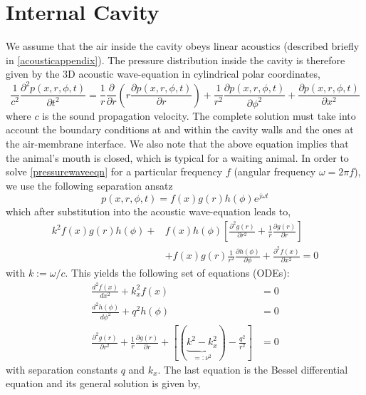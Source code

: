 \section{Internal Cavity}
We assume that the air inside the cavity obeys linear acoustics (described briefly in \ref{acousticappendix}). The pressure distribution inside the cavity
is therefore given by the $3$D acoustic wave-equation in cylindrical polar coordinates,	
\begin{equation}\label{pressurewaveeqn}
 \frac{1}{c^2}\frac{\partial^2 p(x,r,\phi,t)}{\partial t^2}=\frac{1}{r}\frac{\partial}{\partial r}\left(r\frac{\partial p(x,r,\phi,t)}{\partial r}\right)
 +\frac{1}{r^2}\frac{\partial p(x,r,\phi,t)}{\partial \phi^2}+\frac{\partial p(x,r,\phi,t)}{\partial x^2}
\end{equation}
where $c$ is the sound propagation velocity. The complete solution must take into account the boundary conditions at and within the cavity walls and the
ones at the air-membrane interface. We also note that the above equation implies that the animal's mouth is closed, which is typical for a waiting
animal. In order to solve \eqref{pressurewaveeqn} for a particular frequency $f$ (angular frequency $\omega=2\pi f$), we use the following
separation ansatz
\begin{equation}\label{pseparationansatz}
  p(x,r,\phi,t)=f(x)g(r)h(\phi)e^{j\omega t}
\end{equation}
which after substitution into the acoustic wave-equation leads to,
\begin{equation}\label{pseparationansatz2}
\begin{split}
 k^2f(x)g(r)h(\phi)+&f(x)h(\phi)\left[\frac{\partial^2 g(r)}{\partial r^2} + \frac{1}{r}\frac{\partial g(r)}{\partial r}\right] \\
 &+f(x)g(r)\frac{1}{r^2}\frac{\partial h(\phi)}{\partial \phi}+\frac{\partial^2 f(x)}{\partial x^2}=0
\end{split}
\end{equation}
with $k:=\omega/c$. This yields the following set of equations (ODEs):
\begin{align}
 \frac{d^2 f(x)}{dx^2}+k^2_xf(x)&=0\\
 \frac{d^2 h(\phi)}{d\phi^2}+q^2h(\phi	)&=0\\
 \frac{\partial^2 g(r)}{\partial r^2} + \frac{1}{r}\frac{\partial g(r)}{\partial r}+\left[(\displaystyle\underbrace{k^2-k^2_x}_{=:\nu^2})-\frac{q^2}{r^2}\right]&=0\label{besselequation1}
\end{align}
with separation constants $q$ and $k_x$. The last equation is the Bessel differential equation \cite[p.~313]{copsonbessel} and its general solution is given by,
